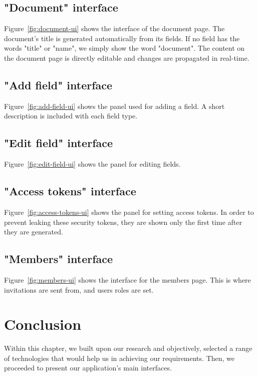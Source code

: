 \subsection{"Document" interface}
Figure~\ref{fig:document-ui} shows the interface of the document page. The document's title is generated automatically from its fields. If no field has the words "title" or "name", we simply show the word "document".
The content on the document page is directly editable and changes are propagated in real-time.



\subsection{"Add field" interface}
Figure~\ref{fig:add-field-ui} shows the panel used for adding a field.
A short description is included with each field type.



\subsection{"Edit field" interface}
Figure~\ref{fig:edit-field-ui} shows the panel for editing fields.



\subsection{"Access tokens" interface}
Figure~\ref{fig:access-tokens-ui} shows the panel for setting access tokens. In order to prevent leaking these security tokens, they are shown only the first time after they are generated.



\subsection{"Members" interface}
Figure~\ref{fig:members-ui} shows the interface for the members page. This is where invitations are sent from, and users roles are set.


\section{Conclusion}

Within this chapter, we built upon our research and objectively, selected a range of technologies that would help us in achieving our requirements. Then, we proceeded to present our application's main interfaces.